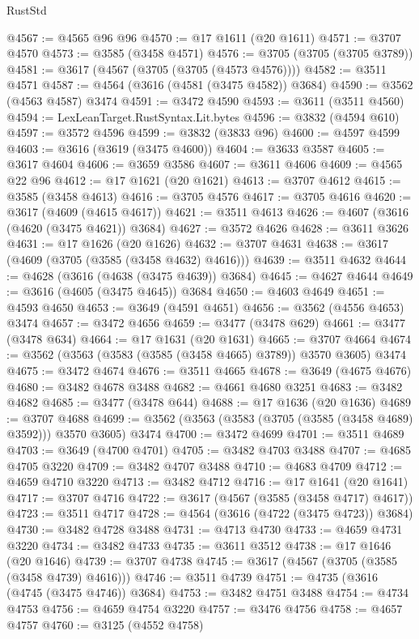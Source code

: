 \begin{lexlean}{RustStd}
\begin{coremodule}
{\begin{coremodule}
{{{{{{{{{{{{{{{{{{{{{{{{{{{{{{{{{{{{{{{{{{{{{@4567 := @4565 @96 @96
@4570 := @17 @1611 (@20 @1611)
@4571 := @3707 @4570
@4573 := @3585 (@3458 @4571)
@4576 := @3705 (@3705 (@3705 @3789))
@4581 := @3617 (@4567 (@3705 (@3705 (@4573 @4576))))
@4582 := @3511 @4571
@4587 := @4564 (@3616 (@4581 (@3475 @4582)) @3684)
@4590 := @3562 (@4563 @4587) @3474
@4591 := @3472 @4590
@4593 := @3611 (@3511 @4560)
@4594 := LexLeanTarget.RustSyntax.Lit.bytes
@4596 := @3832 (@4594 @610)
@4597 := @3572 @4596
@4599 := @3832 (@3833 @96)
@4600 := @4597 @4599
@4603 := @3616 (@3619 (@3475 @4600))
@4604 := @3633 @3587
@4605 := @3617 @4604
@4606 := @3659 @3586
@4607 := @3611 @4606
@4609 := @4565 @22 @96
@4612 := @17 @1621 (@20 @1621)
@4613 := @3707 @4612
@4615 := @3585 (@3458 @4613)
@4616 := @3705 @4576
@4617 := @3705 @4616
@4620 := @3617 (@4609 (@4615 @4617))
@4621 := @3511 @4613
@4626 := @4607 (@3616 (@4620 (@3475 @4621)) @3684)
@4627 := @3572 @4626
@4628 := @3611 @3626
@4631 := @17 @1626 (@20 @1626)
@4632 := @3707 @4631
@4638 := @3617 (@4609 (@3705 (@3585 (@3458 @4632) @4616)))
@4639 := @3511 @4632
@4644 := @4628 (@3616 (@4638 (@3475 @4639)) @3684)
@4645 := @4627 @4644
@4649 := @3616 (@4605 (@3475 @4645)) @3684
@4650 := @4603 @4649
@4651 := @4593 @4650
@4653 := @3649 (@4591 @4651)
@4656 := @3562 (@4556 @4653) @3474
@4657 := @3472 @4656
@4659 := @3477 (@3478 @629)
@4661 := @3477 (@3478 @634)
@4664 := @17 @1631 (@20 @1631)
@4665 := @3707 @4664
@4674 := @3562 (@3563 (@3583 (@3585 (@3458 @4665) @3789)) @3570 @3605) @3474
@4675 := @3472 @4674
@4676 := @3511 @4665
@4678 := @3649 (@4675 @4676)
@4680 := @3482 @4678 @3488
@4682 := @4661 @4680 @3251
@4683 := @3482 @4682
@4685 := @3477 (@3478 @644)
@4688 := @17 @1636 (@20 @1636)
@4689 := @3707 @4688
@4699 := @3562 (@3563 (@3583 (@3705 (@3585 (@3458 @4689) @3592))) @3570 @3605) @3474
@4700 := @3472 @4699
@4701 := @3511 @4689
@4703 := @3649 (@4700 @4701)
@4705 := @3482 @4703 @3488
@4707 := @4685 @4705 @3220
@4709 := @3482 @4707 @3488
@4710 := @4683 @4709
@4712 := @4659 @4710 @3220
@4713 := @3482 @4712
@4716 := @17 @1641 (@20 @1641)
@4717 := @3707 @4716
@4722 := @3617 (@4567 (@3585 (@3458 @4717) @4617))
@4723 := @3511 @4717
@4728 := @4564 (@3616 (@4722 (@3475 @4723)) @3684)
@4730 := @3482 @4728 @3488
@4731 := @4713 @4730
@4733 := @4659 @4731 @3220
@4734 := @3482 @4733
@4735 := @3611 @3512
@4738 := @17 @1646 (@20 @1646)
@4739 := @3707 @4738
@4745 := @3617 (@4567 (@3705 (@3585 (@3458 @4739) @4616)))
@4746 := @3511 @4739
@4751 := @4735 (@3616 (@4745 (@3475 @4746)) @3684)
@4753 := @3482 @4751 @3488
@4754 := @4734 @4753
@4756 := @4659 @4754 @3220
@4757 := @3476 @4756
@4758 := @4657 @4757
@4760 := @3125 (@4552 @4758)
}}}}}}}}}}}}}}}}}}}}}}}}}}}}}}}}}}}}}}}}}}}}}
\end{coremodule}}
\end{coremodule}
\end{lexlean}
